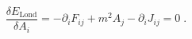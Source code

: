 \begin{equation}
\frac{\delta E_{\mathrm{Lond}}}{\delta A_{i}}=-\partial
_{i}F_{ij}+m^{2}A_{j}-\partial _{i}J_{ij}=0\;.  \label{eqm}
\end{equation}

